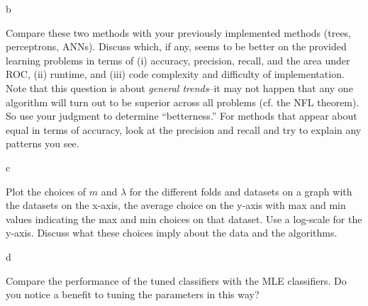 \documentclass[fleqn]{homework}
\begin{document}
  \begin{problem}{b}
    \begin{question}
      Compare these two methods with your previously implemented methods (trees,
      perceptrons, ANNs).  Discuss which, if any, seems to be better on the
      provided learning problems in terms of (i) accuracy, precision, recall,
      and the area under ROC, (ii) runtime, and (iii) code complexity and
      difficulty of implementation.  Note that this question is about
      \textit{general trends}--it may not happen that any one algorithm will
      turn out to be superior across all problems (cf. the NFL theorem).  So use
      your judgment to determine ``betterness.''  For methods that appear about
      equal in terms of accuracy, look at the precision and recall and try to
      explain any patterns you see.
    \end{question}
  \end{problem}

  \begin{problem}{c}
    \begin{question}
      Plot the choices of $m$ and $\lambda$ for the different folds and datasets
      on a graph with the datasets on the x-axis, the average choice on the
      y-axis with max and min values indicating the max and min choices on that
      dataset.  Use a log-scale for the y-axis.  Discuss what these choices
      imply about the data and the algorithms.
    \end{question}
  \end{problem}

  \begin{problem}{d}
    \begin{question}
      Compare the performance of the tuned classifiers with the MLE classifiers.
      Do you notice a benefit to tuning the parameters in this way?
    \end{question}
  \end{problem}
\end{document}
